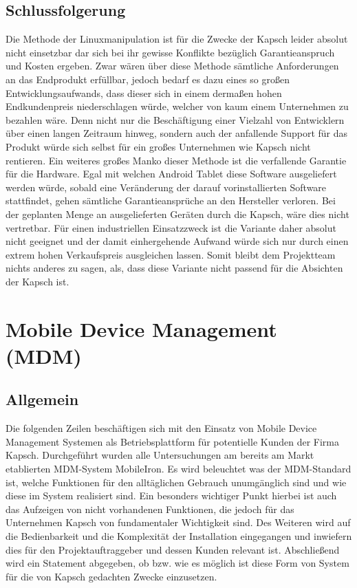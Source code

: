 \subsection{Schlussfolgerung}
Die Methode der Linuxmanipulation ist für die Zwecke der Kapsch leider absolut nicht einsetzbar dar sich bei ihr gewisse Konflikte bezüglich Garantieanspruch und Kosten ergeben. Zwar wären über diese Methode sämtliche Anforderungen an das Endprodukt erfüllbar, jedoch bedarf es dazu eines so großen Entwicklungsaufwands, dass dieser sich in einem dermaßen hohen Endkundenpreis niederschlagen würde, welcher von kaum einem Unternehmen zu bezahlen wäre. Denn nicht nur die Beschäftigung einer Vielzahl von Entwicklern über einen langen Zeitraum hinweg, sondern auch der anfallende Support für das Produkt würde sich selbst für ein großes Unternehmen wie Kapsch nicht rentieren. Ein weiteres großes Manko dieser Methode ist die verfallende Garantie für die Hardware. Egal mit welchen Android Tablet diese Software ausgeliefert werden würde, sobald eine Veränderung der darauf vorinstallierten Software stattfindet, gehen sämtliche Garantieansprüche an den Hersteller verloren. Bei der geplanten Menge an ausgelieferten Geräten durch die Kapsch, wäre dies nicht vertretbar. Für einen industriellen Einsatzzweck ist die Variante daher absolut nicht geeignet und der damit einhergehende Aufwand würde sich nur durch einen extrem hohen Verkaufspreis ausgleichen lassen. Somit bleibt dem Projektteam nichts anderes zu sagen, als, dass diese Variante nicht passend für die Absichten der Kapsch ist.

\newpage
\section{Mobile Device Management (MDM)}
\subsection{Allgemein}
Die folgenden Zeilen beschäftigen sich mit den Einsatz von Mobile Device Management Systemen als Betriebsplattform für potentielle Kunden der Firma Kapsch. Durchgeführt wurden alle Untersuchungen am bereits  am Markt etablierten MDM-System MobileIron. Es wird beleuchtet was der MDM-Standard ist, welche Funktionen für den alltäglichen Gebrauch unumgänglich sind und wie diese im System realisiert sind. Ein besonders wichtiger Punkt hierbei ist auch das Aufzeigen von nicht vorhandenen Funktionen, die jedoch für das Unternehmen Kapsch von fundamentaler Wichtigkeit sind. Des Weiteren wird auf die Bedienbarkeit und die Komplexität der Installation eingegangen und inwiefern dies für den Projektauftraggeber und dessen Kunden relevant ist. Abschließend  wird ein Statement abgegeben, ob bzw. wie es möglich ist diese Form von System für die von Kapsch gedachten Zwecke einzusetzen.
